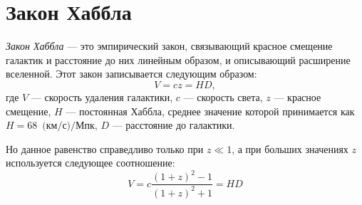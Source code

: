 \section{Закон Хаббла}
\textit{Закон Хаббла} --- это эмпирический закон, связывающий красное смещение галактик и расстояние до них линейным образом, и описывающий расширение вселенной. Этот закон записывается следующим образом:
\begin{equation}
V=cz=HD,
\end{equation}
где $V$ --- скорость удаления галактики, $c$ --- скорость света, $z$ --- красное смещение, $H$ --- постоянная Хаббла, среднее значение которой принимается как $H=68$~$\text{(км/с)}/\text{Мпк}$, $D$ --- расстояние до галактики. 

Но данное равенство справедливо только при $z\ll1$, а при больших значениях $z$ используется следующее соотношение:
\begin{equation}
V=c\frac{(1+z)^2-1}{(1+z)^2+1}=HD
\end{equation}